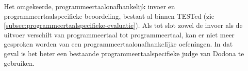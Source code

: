 Het omgekeerde, programmeertaalonafhankelijk invoer en programmeertaalspecifieke beoordeling, bestaat al binnen TESTed (zie \cref{subsec:programmeertaalspecifieke-evaluatie}).
Als tot slot zowel de invoer als de uitvoer verschilt van programmeertaal tot programmeertaal, kan er niet meer gesproken worden van een programmeertaalonafhankelijke oefeningen.
In dat geval is het beter een bestaande programmeertaalspecifieke judge van Dodona te gebruiken.

%
%
%
%
%
